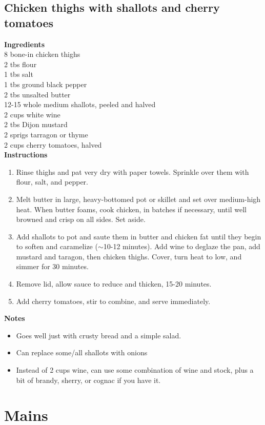 \documentclass{article}
\numberwithin{figure}{section}
\numberwithin{equation}{section}
\begin{document}
\subsection{Chicken thighs with shallots and cherry tomatoes}
{\bf Ingredients}\\
8 bone-in chicken thighs\\
2 tbs flour\\
1 tbs salt\\
1 tbs ground black pepper\\
2 tbs unsalted butter\\
12-15 whole medium shallots, peeled and halved\\
2 cups white wine\\
2 tbs Dijon mustard\\
2 sprigs tarragon or thyme\\
2 cups cherry tomatoes, halved\\

{\bf Instructions}
\begin{enumerate}
\item Rinse thighs and pat very dry with paper towels.  Sprinkle over them with flour, salt, and pepper.
\item Melt butter in large, heavy-bottomed pot or skillet and set over medium-high heat.  When butter foams, cook chicken, in batches if necessary, until well browned and crisp on all sides. Set aside.
\item Add shallots to pot and saute them in butter and chicken fat until they begin to soften and caramelize ($\sim$10-12 minutes).  Add wine to deglaze the pan, add mustard and taragon, then chicken thighs.  Cover, turn heat to low, and simmer for 30 minutes.
\item Remove lid, allow sauce to reduce and thicken, 15-20 minutes.
\item Add cherry tomatoes, stir to combine, and serve immediately.
\end{enumerate}

{\bf Notes}
\begin{itemize}
\item Goes well just with crusty bread and a simple salad.
\item Can replace some/all shallots with onions
\item Instead of 2 cups wine, can use some combination of wine and stock, plus a bit of brandy, sherry, or cognac if you have it. 
\end{itemize}


\pagebreak
\section{Mains}
\end{document}
